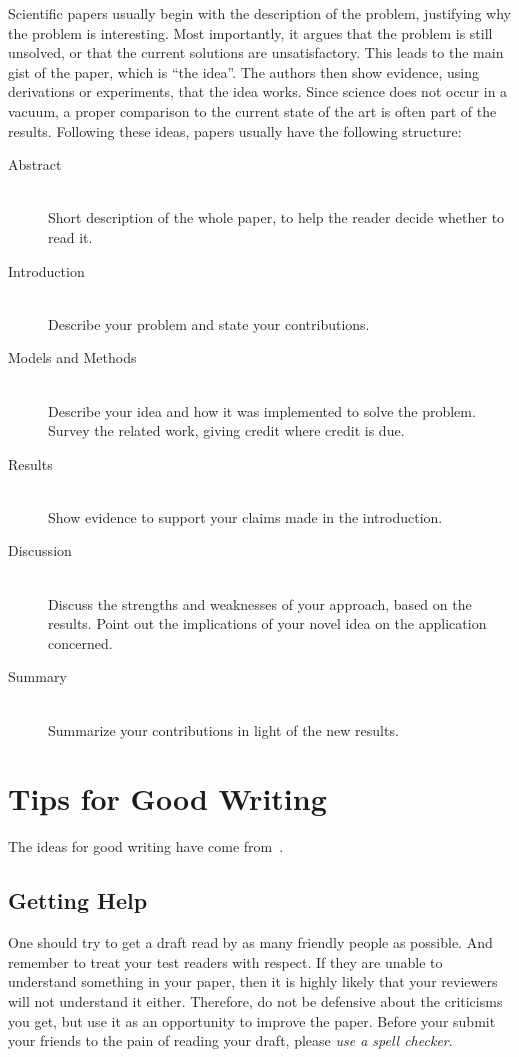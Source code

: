 \documentclass[10pt,conference,compsocconf]{IEEEtran}
\begin{document}
  Scientific papers usually begin with the description of the problem,
justifying why the problem is interesting. Most importantly, it argues
that the problem is still unsolved, or that the current solutions are
unsatisfactory. This leads to the main gist of the paper, which is
``the idea''. The authors then show evidence, using derivations or
experiments, that the idea works. Since science does not occur in a
vacuum, a proper comparison to the current state of the art is often
part of the results. Following these ideas, papers usually have the
following structure:
\begin{description}
\item[Abstract] \ \\
  Short description of the whole paper, to help the
  reader decide whether to read it.
\item[Introduction] \ \\
  Describe your problem and state your
  contributions.
\item[Models and Methods] \ \\
  Describe your idea and how it was implemented to solve
  the problem. Survey the related work, giving credit where credit is
  due.
\item[Results] \ \\
  Show evidence to support your claims made in the
  introduction.
\item[Discussion] \ \\
  Discuss the strengths and weaknesses of your
  approach, based on the results. Point out the implications of your
  novel idea on the application concerned.
\item[Summary] \ \\
  Summarize your contributions in light of the new
  results.
\end{description}


\section{Tips for Good Writing}
\label{sec:tips-writing}

The ideas for good writing have come
from~\cite{editor10,jones08,anderson04}.

\subsection{Getting Help}
One should try to get a draft read by as many friendly people as
possible. And remember to treat your test readers with respect. If
they are unable to understand something in your paper, then it is
highly likely that your reviewers will not understand it
either. Therefore, do not be defensive about the criticisms you get,
but use it as an opportunity to improve the paper. Before your submit
your friends to the pain of reading your draft, please \emph{use a
  spell checker}.
\end{document}
